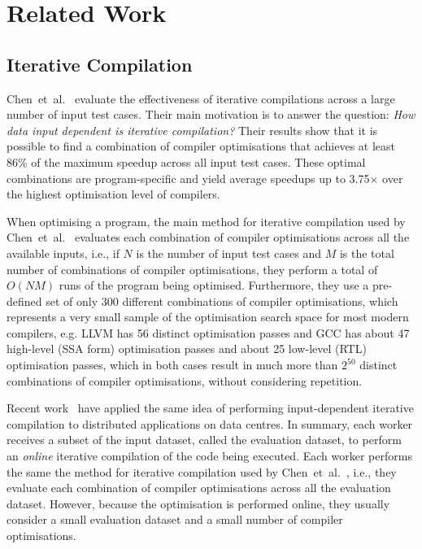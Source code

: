 \documentclass[sigplan,9pt]{acmart}
\newcommand{\etal}{et~al.}
\newcommand{\itercomp}{{iterative compilation}}
\newcommand{\IterComp}{{Iterative Compilation}}
\begin{document}
\section{Related Work}

\subsection{{\IterComp}}

Chen~\etal~\cite{chen10,chen12a} evaluate the effectiveness of iterative compilations across a large number of input test cases.
Their main motivation is to answer the question:
\textit{How data input dependent is {\itercomp}?}
Their results show that it is possible to find a combination of compiler optimisations that achieves at least 86\% of the maximum speedup across all input test cases.
These optimal combinations are program-specific and yield average speedups up to 3.75$\times$ over the highest optimisation level of compilers.

When optimising a program, the main method for {\itercomp} used by Chen~\etal~\cite{chen10,chen12a} evaluates each combination of compiler optimisations across all the available inputs, i.e., if $N$ is the number of input test cases and $M$ is the total number of combinations of compiler optimisations, they perform a total of $O(NM)$ runs of the program being optimised.
Furthermore, they use a pre-defined set of only 300 different combinations of compiler optimisations, which represents a very small sample of the optimisation search space for most modern compilers, e.g.
LLVM has 56 distinct optimisation passes and GCC has about 47 high-level (SSA form) optimisation passes and about 25 low-level (RTL) optimisation passes, which in both cases result in much more than $2^{50}$ distinct combinations of compiler optimisations, without considering repetition.

Recent work~\cite{chen12b,fang15} have applied the same idea of performing input-dependent {\itercomp} to distributed applications on data centres.
In summary, each worker receives a subset of the input dataset, called the evaluation dataset, to perform an \textit{online} {\itercomp} of the code being executed.
Each worker performs the same the method for {\itercomp} used by Chen~\etal~\cite{chen10,chen12a}, i.e., they evaluate each combination of compiler optimisations across all the evaluation dataset.
However, because the optimisation is performed online, they usually consider a small evaluation dataset and a small number of compiler optimisations.
\end{document}
